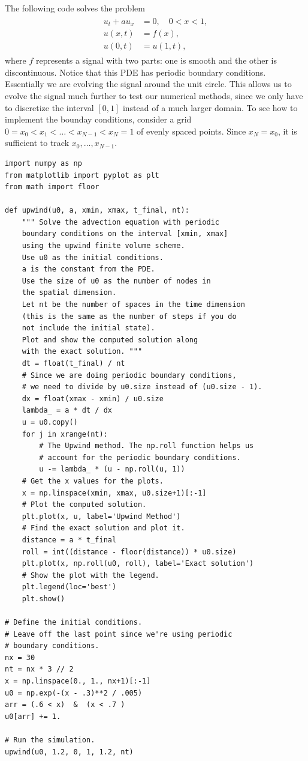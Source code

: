 The following code solves the problem
\begin{align}
\begin{split}
	u_t +a u_x &= 0, \quad 0 < x < 1, \\
	u(x,t) &= f(x),\\
	u(0,t) &= u(1,t),
\end{split}\label{eqn:fv_exercise}
\end{align}
where $f$ represents a signal with two parts: one is smooth and the other is discontinuous.
Notice that this PDE has periodic boundary conditions.
Essentially we are evolving the signal around the unit circle.
This allows us to evolve the signal much further to test our numerical methods, since we only have to discretize the interval $[0,1]$ instead of a much larger domain.
To see how to implement the bounday conditions, consider a grid $0 = x_0< x_1< \ldots< x_{N-1}< x_N = 1$ of evenly spaced points.
Since $x_N = x_0$, it is sufficient to track $x_0, \ldots , x_{N-1}$.

\begin{lstlisting}
import numpy as np
from matplotlib import pyplot as plt
from math import floor

def upwind(u0, a, xmin, xmax, t_final, nt):
    """ Solve the advection equation with periodic
    boundary conditions on the interval [xmin, xmax]
    using the upwind finite volume scheme.
    Use u0 as the initial conditions.
    a is the constant from the PDE.
    Use the size of u0 as the number of nodes in
    the spatial dimension.
    Let nt be the number of spaces in the time dimension
    (this is the same as the number of steps if you do
    not include the initial state).
    Plot and show the computed solution along
    with the exact solution. """
    dt = float(t_final) / nt
    # Since we are doing periodic boundary conditions,
    # we need to divide by u0.size instead of (u0.size - 1).
    dx = float(xmax - xmin) / u0.size
    lambda_ = a * dt / dx
    u = u0.copy()
    for j in xrange(nt):
        # The Upwind method. The np.roll function helps us 
        # account for the periodic boundary conditions.
        u -= lambda_ * (u - np.roll(u, 1))
    # Get the x values for the plots.
    x = np.linspace(xmin, xmax, u0.size+1)[:-1]
    # Plot the computed solution.
    plt.plot(x, u, label='Upwind Method')
    # Find the exact solution and plot it.
    distance = a * t_final
    roll = int((distance - floor(distance)) * u0.size)
    plt.plot(x, np.roll(u0, roll), label='Exact solution')
    # Show the plot with the legend.
    plt.legend(loc='best')
    plt.show()

# Define the initial conditions.
# Leave off the last point since we're using periodic
# boundary conditions.
nx = 30
nt = nx * 3 // 2
x = np.linspace(0., 1., nx+1)[:-1]
u0 = np.exp(-(x - .3)**2 / .005)
arr = (.6 < x)  &  (x < .7 )
u0[arr] += 1.

# Run the simulation.
upwind(u0, 1.2, 0, 1, 1.2, nt)
\end{lstlisting}

